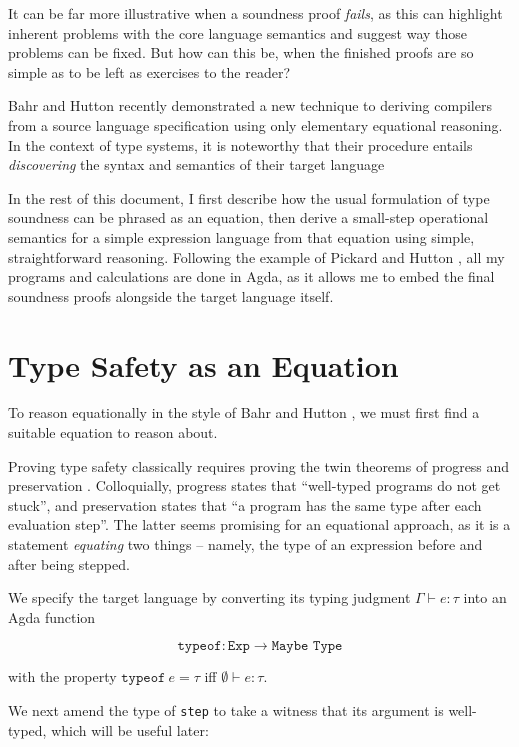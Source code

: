 \documentclass[manuscript,screen,review,sigplan]{acmart}
\begin{document}
It can be far more illustrative when a soundness proof \emph{fails}, as this
can highlight inherent problems with the core language semantics and suggest
way those problems can be fixed. But how can this be, when the finished proofs
are so simple as to be left as exercises to the reader?

Bahr and Hutton \cite{bahr:2015} recently demonstrated a new technique to
deriving compilers from a source language specification using only elementary
equational reasoning. In the context of type systems, it is noteworthy that
their procedure entails \emph{discovering} the syntax and semantics of their
target language

In the rest of this document, I first describe how the usual formulation of
type soundness can be phrased as an equation, then derive a small-step
operational semantics for a simple expression language from that equation using
simple, straightforward reasoning. Following the example of Pickard and Hutton
\cite{pickard:2021}, all my programs and calculations are done in Agda, as it
allows me to embed the final soundness proofs alongside the target language
itself.

\section{Type Safety as an Equation}

To reason equationally in the style of Bahr and Hutton \cite{bahr:2015}, we must
first find a suitable equation to reason about.

Proving type safety classically requires proving the twin theorems of
progress and preservation \cite{harper:pfpl}. Colloquially, progress states
that ``well-typed programs do not get stuck'', and preservation states that
``a program has the same type after each evaluation step''. The latter seems
promising for an equational approach, as it is a statement \emph{equating} two
things -- namely, the type of an expression before and after being stepped.

We specify the target language by converting its typing judgment $\Gamma
\vdash e : \tau$ into an Agda function

\begin{equation}
  \texttt{typeof} : \texttt{Exp} \rightarrow \texttt{Maybe Type}
\end{equation}

with the property $\texttt{typeof}\ e = \tau$ iff $\emptyset \vdash e : \tau$.

We next amend the type of \texttt{step} to take a witness that its argument
is well-typed, which will be useful later:
\end{document}
